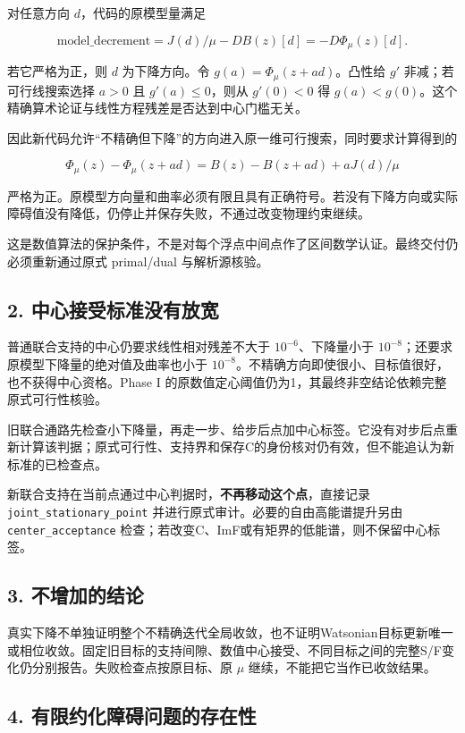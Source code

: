 \documentclass[
  10pt,
  a4paper,
]{article}
\begin{document}
对任意方向 \(d\)，代码的原模型量满足

\[
\mathrm{model\_decrement}
=J(d)/\mu-DB(z)[d]=-D\Phi_\mu(z)[d].
\]

若它严格为正，则 \(d\) 为下降方向。令 \(g(a)=\Phi_\mu(z+ad)\)。凸性给
\(g'\) 非减；若可行线搜索选择 \(a>0\) 且 \(g'(a)\le0\)，则从 \(g'(0)<0\)
得 \(g(a)<g(0)\)。这个精确算术论证与线性方程残差是否达到中心门槛无关。

因此新代码允许``不精确但下降''的方向进入原一维可行搜索，同时要求计算得到的

\[
\Phi_\mu(z)-\Phi_\mu(z+ad)
=B(z)-B(z+ad)+aJ(d)/\mu
\]

严格为正。原模型方向量和曲率必须有限且具有正确符号。若没有下降方向或实际障碍值没有降低，仍停止并保存失败，不通过改变物理约束继续。

这是数值算法的保护条件，不是对每个浮点中间点作了区间数学认证。最终交付仍必须重新通过原式
primal/dual 与解析源核验。

\subsection{2.
中心接受标准没有放宽}\label{ux4e2dux5fc3ux63a5ux53d7ux6807ux51c6ux6ca1ux6709ux653eux5bbd}

普通联合支持的中心仍要求线性相对残差不大于 \(10^{-6}\)、下降量小于
\(10^{-8}\)；还要求原模型下降量的绝对值及曲率也小于
\(10^{-8}\)。不精确方向即使很小、目标值很好，也不获得中心资格。Phase I
的原数值定心阈值仍为1，其最终非空结论依赖完整原式可行性核验。

旧联合通路先检查小下降量，再走一步、给步后点加中心标签。它没有对步后点重新计算该判据；原式可行性、支持界和保存C的身份核对仍有效，但不能追认为新标准的已检查点。

新联合支持在当前点通过中心判据时，\textbf{不再移动这个点}，直接记录
\texttt{joint\_stationary\_point}
并进行原式审计。必要的自由高能谱提升另由 \texttt{center\_acceptance}
检查；若改变C、ImF或有矩界的低能谱，则不保留中心标签。

\subsection{3. 不增加的结论}\label{ux4e0dux589eux52a0ux7684ux7ed3ux8bba}

真实下降不单独证明整个不精确迭代全局收敛，也不证明Watsonian目标更新唯一或相位收敛。固定旧目标的支持间隙、数值中心接受、不同目标之间的完整S/F变化仍分别报告。失败检查点按原目标、原
\(\mu\) 继续，不能把它当作已收敛结果。

\subsection{4.
有限约化障碍问题的存在性}\label{ux6709ux9650ux7ea6ux5316ux969cux788dux95eeux9898ux7684ux5b58ux5728ux6027}
\end{document}
